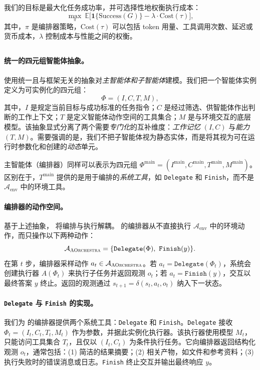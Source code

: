 我们的目标是最大化任务成功率，并可选择性地权衡执行成本：
\[
\max_{\pi}\ \mathbb{E}\Big[\mathbf{1}\{\text{Success}(G)\}-\lambda\cdot \text{Cost}(\tau)\Big],
\]
其中，$\pi$ 是编排器策略，$\text{Cost}(\tau)$ 可以包括 token 用量、工具调用次数、延迟或货币成本，$\lambda$ 控制成本与性能之间的权衡。

\subsection{\our{}}
\label{sec:method_design}

\paragraph{统一的四元组智能体抽象。}
\our{} 使用统一且与框架无关的抽象对\emph{主智能体和子智能体}建模。我们把一个智能体实例定义为可实例化的四元组：
\[
\Phi = (I, C, T, M),
\]
其中，$I$ 是规定当前目标与成功标准的任务指令；$C$ 是经过筛选、供智能体作出判断的工作上下文；$T$ 是定义智能体动作空间的工具集合；$M$ 是与环境交互的底层模型。该抽象显式分离了两个需要\textit{专门化}的互补维度：\emph{工作记忆} $(I,C)$ 与\emph{能力} $(T,M)$。需要强调的是，我们不把子智能体视为静态实体，而是将其视为可在运行时参数化和创建的\emph{动态}单元。

主智能体（编排器）同样可以表示为四元组 $\Phi^{\text{main}}=(I^{\text{main}},C^{\text{main}},T^{\text{main}},M^{\text{main}})$。区别在于，$T^{\text{main}}$ 提供的是用于编排的\emph{系统工具}，如 \texttt{Delegate} 和 \texttt{Finish}，而不是 $\mathcal{A}_{\text{env}}$ 中的环境工具。

\paragraph{编排器的动作空间。}
基于上述抽象，\our{} 将编排与执行解耦。\our{} 的编排器从不直接执行 $\mathcal{A}_{\text{env}}$ 中的环境动作，而只操作以下两种动作：
\[
\mathcal{A}_{\our} = \{\texttt{Delegate}(\Phi),\ \texttt{Finish}(y)\}.
\]
在第 $t$ 步，编排器采样动作 $a_t \in \mathcal{A}_{\textsc{AOrchestra}}$。若 $a_t=\texttt{Delegate}(\Phi_t)$，系统会创建执行器 $A(\Phi_t)$ 来执行子任务并返回观测 $o_t$；若 $a_t=\texttt{Finish}(y)$，交互以最终答案 $y$ 终止。返回的观测通过 $s_{t+1}=\delta(s_t,a_t,o_t)$ 纳入下一状态。

\paragraph{\texttt{Delegate} 与 \texttt{Finish} 的实现。}
我们为 \our{} 的编排器提供两个系统工具：\texttt{Delegate} 和 \texttt{Finish}。\texttt{Delegate} 接收 $\Phi_t=(I_t,C_t,T_t,M_t)$ 作为参数，并据此实例化执行器。该执行器使用模型 $M_t$，只能访问工具集合 $T_t$，且仅以 $(I_t,C_t)$ 为条件执行任务。它向编排器返回结构化观测 $o_t$，通常包括：(1) 简洁的结果摘要；(2) 相关产物，如文件和参考资料；(3) 执行失败时的错误消息或日志。\texttt{Finish} 终止交互并输出最终响应 $y$。

